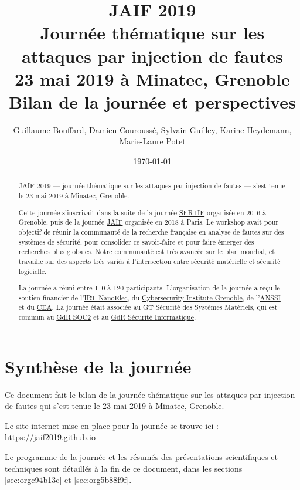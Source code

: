 \documentclass[a4paper,11pt]{article}
\author{Guillaume Bouffard,  Damien Couroussé, Sylvain Guilley,  Karine Heydemann, Marie-Laure Potet}
\date{\today}
\title{JAIF 2019 \\ Journée thématique sur les attaques par injection de fautes \\ 23 mai 2019 à Minatec, Grenoble\\\medskip
\large Bilan de la journée et perspectives}
\begin{document}
\maketitle
\setcounter{tocdepth}{1}
\tableofcontents

\begin{abstract}
JAIF 2019 --- journée thématique sur les attaques par injection de
fautes --- s'est tenue le 23 mai 2019 à Minatec, Grenoble.

Cette journée s’inscrivait dans la suite de la journée \href{https://lazart.gricad-pages.univ-grenoble-alpes.fr/sertif/pages/workshop.html}{SERTIF} organisée
en 2016 à Grenoble,
puis de la journée \href{https://wp-systeme.lip6.fr/jaif}{JAIF} organisée en 2018 à Paris.
Le workshop avait pour objectif de réunir la communauté de la
recherche française en analyse de fautes sur des systèmes de sécurité,
pour consolider ce savoir-faire et pour faire émerger des recherches
plus globales.  Notre communauté est très avancée sur le plan mondial,
et travaille sur des aspects très variés à l'intersection entre
sécurité matérielle et sécurité logicielle.

La journée a réuni entre 110 à 120 participants.  L'organisation de la
journée a reçu le soutien financier de l'\href{http://www.irtnanoelec.fr}{IRT NanoElec}, du
\href{https://cybersecurity.univ-grenoble-alpes.fr/}{Cybersecurity Institute Grenoble}, de l'\href{https://www.ssi.gouv.fr}{ANSSI} et du \href{http://www.cea-tech.fr}{CEA}.  La journée
était associée au GT Sécurité des Systèmes Matériels, qui est commun
au \href{http://www.gdr-soc.cnrs.fr}{GdR SOC2} et au \href{https://gdr-securite.irisa.fr}{GdR Sécurité Informatique}.
\end{abstract}


\pagebreak
\section{Synthèse de la journée}
\label{sec:org646bd2a}

Ce document fait le bilan de la journée thématique sur les attaques
par injection de fautes qui s'est tenue le 23 mai 2019 à Minatec, Grenoble.

Le site internet mise en place pour la journée se trouve ici :
\url{https://jaif2019.github.io}

Le programme de la journée et les résumés des présentations
scientifiques et techniques sont détaillés à la fin de ce document,
dans les sections \ref{sec:orgc94b13c} et \ref{sec:org5b88f9f}.
\end{document}
